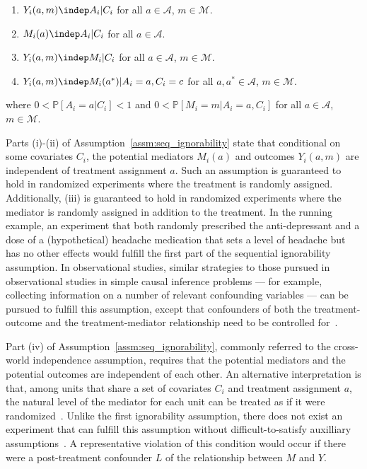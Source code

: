 \begin{assumption}\label{assm:seq_ignorability} 
\indent
\begin{enumerate}[noitemsep,topsep=0pt,label=(\roman*)]
	\item $Y_{i}(a,m) \indep A_{i} | C_{i}$ for all $a \in \mathcal{A}$, $m \in \mathcal{M}$. 
	\item $M_{i}(a) \indep A_{i} | C_{i}$ for all $a \in \mathcal{A}$. 
	\item $Y_{i}(a,m) \indep M_{i} | C_{i}$ for all $a \in \mathcal{A}$, $m \in \mathcal{M}$. 
	\item $Y_{i}(a,m) \indep M_{i}(a^{*}) | A_{i} = a, C_{i} = c$ for all $a,a^{*} \in \mathcal{A}$, $m \in \mathcal{M}$. 
\end{enumerate}
where $0 < \mathbb{P}[A_{i} = a | C_{i}] < 1$ and $0 < \mathbb{P}[M_{i} = m | A_{i} = a, C_{i}]$
 for all $a \in \mathcal{A}$, $m \in \mathcal{M}$. 
\end{assumption}

Parts (i)-(ii) of Assumption~\ref{assm:seq_ignorability} state that conditional on some covariates $C_{i}$, the 
potential mediators $M_{i}(a)$ and outcomes $Y_{i}(a,m)$ are independent of treatment assignment $a$. Such an 
assumption is guaranteed to hold in randomized experiments where the treatment is randomly assigned. Additionally, 
(iii) is guaranteed to hold in randomized experiments where the mediator is randomly assigned in addition to the 
treatment. In the running example, an experiment that both randomly prescribed the anti-depressant and a dose of a 
(hypothetical) headache medication that sets a level of headache but has no other effects would fulfill the 
first part of the sequential ignorability assumption. In observational studies, similar strategies to those pursued
in observational studies in simple causal inference problems --- for example, collecting information on a number
of relevant confounding variables --- can be pursued to fulfill this assumption, except that confounders of both 
the treatment-outcome and the treatment-mediator relationship need to be controlled for~\citep{imaietal2010b}.  

Part (iv) of Assumption~\ref{assm:seq_ignorability}, commonly referred to the cross-world independence assumption, 
requires that the potential mediators and the potential outcomes are independent of each other. 
An alternative interpretation is that, among units that 
share a set of covariates $C_{i}$ and treatment assignment $a$, the natural level of the mediator for each unit 
can be treated as if it were randomized~\citep{imaietal2010a}. Unlike the first ignorability assumption, there does not 
exist an experiment that can fulfill this assumption without difficult-to-satisfy 
auxilliary assumptions~\citep{imaietal2013}. A representative violation of this condition would occur if there were a 
post-treatment confounder $L$ of the relationship between $M$ and $Y$.

